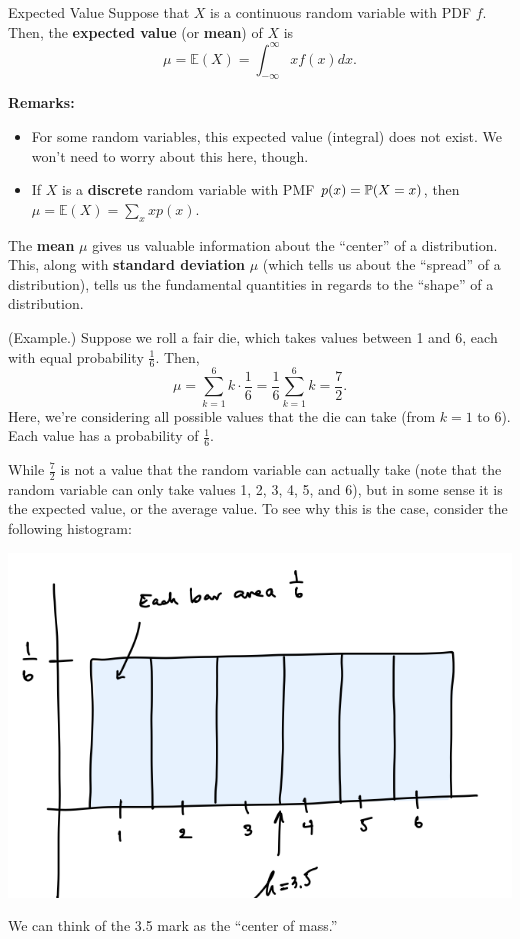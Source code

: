 \documentclass[letterpaper]{article}
\begin{document}
\begin{definition}{Expected Value}{}
    Suppose that $X$ is a continuous random variable with PDF $f$. Then, the \textbf{expected value} (or \textbf{mean}) of $X$ is 
    \[\mu = \mathbb{E}(X) = \int_{-\infty}^{\infty} xf(x)dx.\]
\end{definition}
\textbf{Remarks:} 
\begin{itemize}
    \item For some random variables, this expected value (integral) does not exist. We won't need to worry about this here, though. 
    \item If $X$ is a \textbf{discrete} random variable with PMF $p(x) = \mathbb{P}(X = x)$, then $\mu = \mathbb{E}(X) = \sum_{x} xp(x)$. 
\end{itemize}
The \textbf{mean} $\mu$ gives us valuable information about the ``center'' of a distribution. This, along with \textbf{standard deviation} $\mu$ (which tells us about the ``spread'' of a distribution), tells us the fundamental quantities in regards to the ``shape'' of a distribution. 

\begin{mdframed}[]
    (Example.) Suppose we roll a fair die, which takes values between 1 and 6, each with equal probability $\frac{1}{6}$. Then, 
    \[\mu = \sum_{k = 1}^{6} k \cdot \frac{1}{6} = \frac{1}{6} \sum_{k = 1}^{6} k = \frac{7}{2}.\]
    Here, we're considering all possible values that the die can take (from $k = 1$ to 6). Each value has a probability of $\frac{1}{6}$. 

    \bigskip 

    While $\frac{7}{2}$ is not a value that the random variable can actually take (note that the random variable can only take values 1, 2, 3, 4, 5, and 6), but in some sense it is the expected value, or the average value. To see why this is the case, consider the following histogram:  
    \begin{center}
        \includegraphics[scale=0.7]{../assets/lec14die.png}
    \end{center} 
    We can think of the 3.5 mark as the ``center of mass.''
\end{mdframed}
\end{document}
